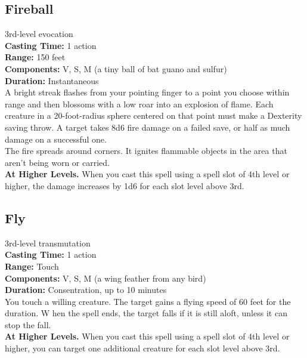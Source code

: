 \documentclass[11pt, A4paper, english]{article}
\begin{document}
		\subsection{Fireball}
3rd-level evocation \\
\textbf{Casting Time:} 1 action \\
\textbf{Range:} 150 feet \\
\textbf{Components:} V, S, M (a tiny ball of bat guano and sulfur) \\
\textbf{Duration:} Instantaneous \\
A bright streak flashes from your pointing finger to a point you choose within range and then blossoms with a low roar into an explosion of flame. Each creature in a 20-foot-radius sphere centered on that point must make a Dexterity saving throw. A target takes 8d6 fire damage on a failed save, or half as much damage on a successful one. \\
The fire spreads around corners. It ignites flammable objects in the area that aren't being worn or carried. \\
\textbf{At Higher Levels.} When you cast this spell using a spell slot of 4th level or higher, the damage increases by 1d6 for each slot level above 3rd.

		\subsection{Fly}
3rd-level transmutation \\
\textbf{Casting Time:} 1 action \\
\textbf{Range:} Touch \\
\textbf{Components:} V, S, M (a wing feather from any bird) \\
\textbf{Duration:} Consentration, up to 10 minutes \\
You touch a willing creature. The target gains a flying speed of 60 feet for the duration. W hen the spell ends, the target falls if it is still aloft, unless it can stop the fall. \\
\textbf{At Higher Levels.} When you cast this spell using a spell slot of 4th level or higher, you can target one additional creature for each slot level above 3rd.
\end{document}
